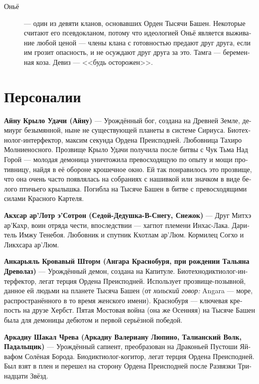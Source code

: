 \documentclass[a4paper,12pt,fleqn]{book}\usepackage{polyglossia}\setdefaultlanguage[babelshorthands=true]{russian}\setotherlanguage{english}\defaultfontfeatures{Ligatures=TeX,Mapping=tex-text}\usepackage{xcolor}\newcommand{\ml}[3]{#2}
\newcommand{\theterm}[3]{\textbf{\hypertarget{#1}{#2}} --- #3}
\newcommand{\theorigin}[3]{\textit{#1:} #2 --- #3}
\begin{document}
{\begin{description}
\item[Оньё] --- один из девяти кланов, основавших Орден Тысячи Башен.
Некоторые считают его псевдокланом, потому что идеологией Оньё является выживание любой ценой --- члены клана с готовностью предают друг друга, если им грозит опасность, и не осуждают друг друга за это.
Тамга --- беременная коза.
Девиз --- <<будь осторожен>>.

\end{description}

\chapter{Персоналии}

\theterm{ainu}
{Айну Крыло Удачи (Айну)} %
{Урождённый бог, создана на Древней Земле, демиург безымянной, ныне не существующей планеты в системе Сириуса.
Биотехнолог-интерфектор, максим секунда Ордена Преисподней.
Любовница Тахиро Молниеносного.
Прозвище Крыло Удачи получила после битвы с Чук Тьма Над Горой --- молодая демоница уничтожила превосходящую по опыту и мощи противницу, найдя в её обороне крошечное окно.
Ей так понравилось это прозвище, что она очень часто появлялась на собраниях с нашивкой или значком в виде белого птичьего крылышка.
Погибла на Тысяче Башен в битве с превосходящими силами Красного Картеля.}

\theterm{akchsar-ar-lotr}
{Акхсар ар’Лотр э’Сотрон (Седой-Дедушка-В-Снегу, Снежок)}
{Друг Митхэ ар'Кахр, воин отряда чести, впоследствии --- хагпот племени Инхас-Лака.
Даритель Имжу Тенебоя.
Любовник и спутник Кхотлам ар'Люм.
Кормилец Согхо и Ликхсара ар'Люм.}

\theterm{ancarjal} %
{Анкарьяль Кровавый Шторм (Ангара Краснобуря, при рождении Тальяна Древолаз)}
{Урождённый демон, создана на Капитуле.
Биотехнодиктиолог-интерфектор, легат терция Ордена Преисподней.
Использует прозвище-позывной, данное ей людьми на планете Тысяча Башен (от \theorigin{хольский говор}{Angara}{море}, распространённого в то время женского имени).
Краснобуря --- ключевая крепость на друзе Хербст.
Пятая Мостовая война (она же Осенняя) на Тысяче Башен была для демоницы дебютом и первой серьёзной победой.}

\theterm{arcadiju} %
{Аркадиу Шакал Чрева (Аркадиу Валериану Люпино, Талианский Волк, Падальщик)}
{Урождённый сапиент, преобразован на Драконьей Пустоши Яйвафом Солёная Борода.
Биодиктиолог-когитор, легат терция Ордена Преисподней.
Был взят в плен и перешел на сторону Ордена Преисподней после Развязки Тринадцати Звёзд.}

}
\end{document}

